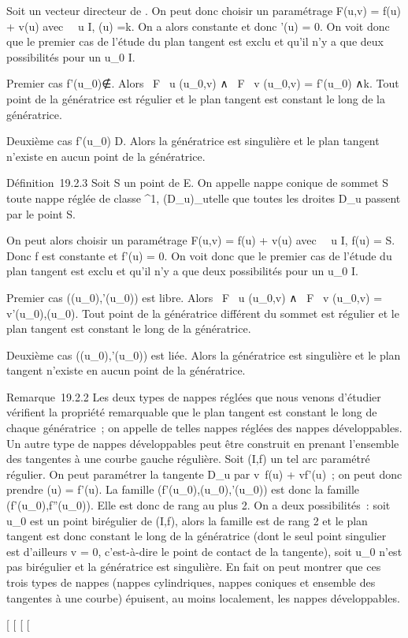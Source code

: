 \documentclass[]{article}
\begin{document}
Soit \veck un vecteur directeur de
\vecD. On peut donc choisir un paramétrage F(u,v) =
f(u) + v\vecg(u) avec \forall~~u \in
I, \vecg(u) =\vec k. On a alors
\vecg constante et donc \vecg'(u)
= 0. On voit donc que le premier cas de l'étude du plan tangent est
exclu et qu'il n'y a que deux possibilités pour un u_0 \in I.

Premier cas
f'(u_0)∉\vecD.
Alors  \partial~F \over \partial~u (u_0,v) ∧ \partial~F
\over \partial~v (u_0,v) = f'(u_0)
∧\vec k. Tout point de la génératrice est régulier et
le plan tangent est constant le long de la génératrice.

Deuxième cas f'(u_0) \in\vec D. Alors la
génératrice est singulière et le plan tangent n'existe en aucun point de
la génératrice.

Définition~19.2.3 Soit S un point de E. On appelle nappe conique de
sommet S toute nappe réglée de classe ^1,
(D_u)_u\inI telle que toutes les droites D_u
passent par le point S.

On peut alors choisir un paramétrage F(u,v) = f(u) +
v\vecg(u) avec \forall~~u \in I, f(u)
= S. Donc f est constante et f'(u) = 0. On voit donc que le premier cas
de l'étude du plan tangent est exclu et qu'il n'y a que deux
possibilités pour un u_0 \in I.

Premier cas
(\vecg(u_0),\vecg'(u_0))
est libre. Alors  \partial~F \over \partial~u (u_0,v) ∧ \partial~F
\over \partial~v (u_0,v) =
v\vecg'(u_0),\vecg(u_0).
Tout point de la génératrice différent du sommet est régulier et le plan
tangent est constant le long de la génératrice.

Deuxième cas
(\vecg(u_0),\vecg'(u_0))
est liée. Alors la génératrice est singulière et le plan tangent
n'existe en aucun point de la génératrice.

Remarque~19.2.2 Les deux types de nappes réglées que nous venons
d'étudier vérifient la propriété remarquable que le plan tangent est
constant le long de chaque génératrice~; on appelle de telles nappes
réglées des nappes développables. Un autre type de nappes développables
peut être construit en prenant l'ensemble des tangentes à une courbe
gauche régulière. Soit (I,f) un tel arc paramétré régulier. On peut
paramétrer la tangente D_u par
v\mapsto~f(u) + vf'(u)~; on peut donc prendre
\vecg(u) = f'(u). La famille
(f'(u_0),\vecg(u_0),\vecg'(u_0))
est donc la famille (f'(u_0),f''(u_0)). Elle est donc
de rang au plus 2. On a deux possibilités~: soit u_0 est un
point birégulier de (I,f), alors la famille est de rang 2 et le plan
tangent est donc constant le long de la génératrice (dont le seul point
singulier est d'ailleurs v = 0, c'est-à-dire le point de contact de la
tangente), soit u_0 n'est pas birégulier et la génératrice est
singulière. En fait on peut montrer que ces trois types de nappes
(nappes cylindriques, nappes coniques et ensemble des tangentes à une
courbe) épuisent, au moins localement, les nappes développables.

{[}
{[}
{[}
{[}
\end{document}
